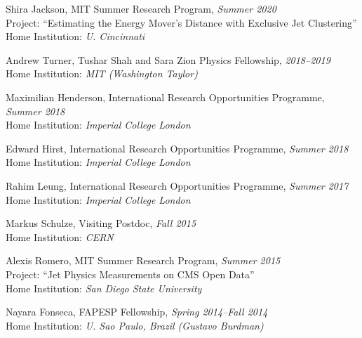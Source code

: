 \item Shira Jackson, MIT Summer Research Program, \emph{Summer 2020}
\\ Project: ``Estimating the Energy Mover’s Distance with Exclusive Jet Clustering''
\\ Home Institution: \emph{U. Cincinnati}

\item Andrew Turner, Tushar Shah and Sara Zion Physics Fellowship, \emph{2018--2019}
\\ Home Institution: \emph{MIT (Washington Taylor)}

\item Maximilian Henderson, International Research Opportunities Programme, \emph{Summer 2018}
\\ Home Institution: \emph{Imperial College London}

\item Edward Hirst, International Research Opportunities Programme, \emph{Summer 2018}
\\ Home Institution: \emph{Imperial College London}

\item Rahim Leung, International Research Opportunities Programme, \emph{Summer 2017}
\\ Home Institution: \emph{Imperial College London}

\item Markus Schulze, Visiting Postdoc, \emph{Fall 2015}
\\ Home Institution: \emph{CERN}

\item Alexis Romero, MIT Summer Research Program, \emph{Summer 2015}
\\ Project: ``Jet Physics Measurements on CMS Open Data''
\\ Home Institution: \emph{San Diego State University}

\item Nayara Fonseca, FAPESP Fellowship, \emph{Spring 2014--Fall 2014}
\\ Home Institution: \emph{U. Sao Paulo, Brazil (Gustavo Burdman)}

\el

